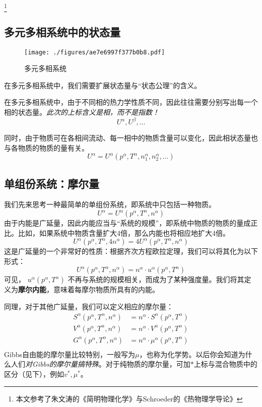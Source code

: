 

\footnote{本文参考了朱文涛的《简明物理化学》与Schroeder的《热物理学导论》}

\subsection{多元多相系统中的状态量}
\begin{figure}[ht]
\centering
\texttt{[image: ./figures/ae7e6997f377b0b8.pdf]}
\caption{多元多相系统} \label{fig_ParMol_1}
\end{figure}

在多元多相系统中，我们需要扩展状态量与“状态公理”的含义。

在多元多相系统中，由于不同相的热力学性质不同，因此往往需要分别写出每一个相的状态量。\textsl{此次的上标含义是相，而不是指数！}
$$U^\alpha, U^\beta,...$$

同时，由于物质可在各相间流动、每一相中的物质含量可以变化，因此相状态量也与各物质的物质的量有关。
$$U^\alpha = U^\alpha (p^\alpha, T^\alpha, n_1^\alpha,n_2^\alpha,...)$$

\subsection{单组份系统：摩尔量}
我们先来思考一种最简单的单组份系统，即系统中只包括一种物质。
$$U^\alpha = U^\alpha (p^\alpha, T^\alpha, n^\alpha)$$
由于内能是广延量，因此内能应当与“系统的规模”，即系统中物质的物质的量成正比。比如，如果系统中物质含量扩大4倍，那么内能也将相应地扩大4倍。
$$U^\alpha(p^\alpha, T^\alpha, 4 n^\alpha) = 4 U^\alpha (p^\alpha, T^\alpha, n^\alpha)$$
这是广延量的一个非常好的性质：根据齐次方程欧拉定理，我们可以将其化为以下形式：
$$U^\alpha(p^\alpha, T^\alpha, n^\alpha) = n^\alpha \cdot u^\alpha (p^\alpha, T^\alpha)$$
可见， $u^\alpha (p^\alpha, T^\alpha)$ 不再与系统的规模相关，而成为了某种强度量。我们将其定义为\textbf{摩尔内能}，意味着每摩尔物质所具有的内能。

同理，对于其他广延量，我们可以定义相应的摩尔量：
$$
\begin{aligned}
S^\alpha(p^\alpha, T^\alpha, n^\alpha) &= n^\alpha \cdot S^\alpha (p^\alpha, T^\alpha)\\
V^\alpha(p^\alpha, T^\alpha, n^\alpha) &= n^\alpha \cdot V^\alpha (p^\alpha, T^\alpha)\\
G^\alpha(p^\alpha, T^\alpha, n^\alpha) &= n^\alpha \cdot \mu^\alpha (p^\alpha, T^\alpha)\\
\end{aligned}
$$
Gibbs自由能的摩尔量比较特别，一般写为$\mu$，也称为化学势。以后你会知道为什么人们\textsl{对Gibbs的摩尔量搞特殊}。对于纯物质的摩尔量，可加$*$上标与混合物质中的区分（见下），例如$v^*, \mu^*$。

